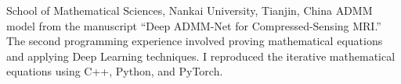 \documentclass[11pt,a4paper, final]{moderncv}
\begin{document}
	{}{}{School of Mathematical Sciences, Nankai University, Tianjin, China}
	{ADMM model from the manuscript ``Deep ADMM-Net for Compressed-Sensing MRI.''}
	{The second programming experience involved proving mathematical equations and applying Deep Learning techniques. 
	I reproduced the iterative mathematical equations using C++, Python, and PyTorch.}
\end{document}
